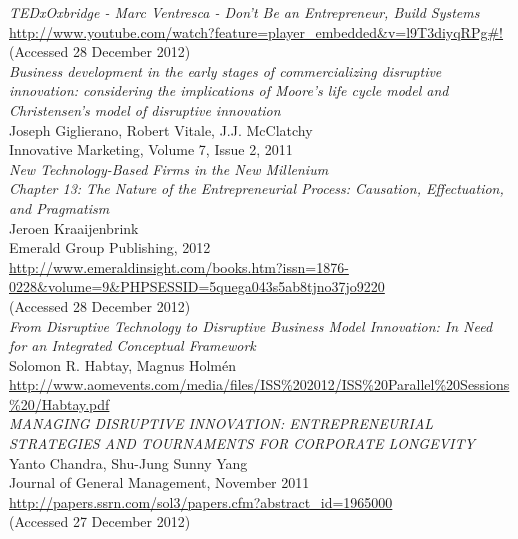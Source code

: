 \documentclass[a4paper,10pt]{book}
\begin{document}
\begin{thebibliography}{9}
 
  \emph{TEDxOxbridge - Marc Ventresca - Don't Be an Entrepreneur, Build Systems}\\
  \url{http://www.youtube.com/watch?feature=player_embedded&v=l9T3diyqRPg#!}\\
  (Accessed 28 December 2012)\\
 
  \emph{Business development in the early stages of commercializing
      disruptive innovation: considering the implications of Moore’s life
      cycle model and Christensen’s model of disruptive innovation}\\
  Joseph Giglierano, Robert Vitale, J.J. McClatchy\\
  Innovative Marketing, Volume 7, Issue 2, 2011\\
  

  \emph{New Technology-Based Firms in the New Millenium\\
	Chapter 13:  The Nature of the Entrepreneurial Process: Causation, Effectuation, and Pragmatism}\\
    Jeroen Kraaijenbrink\\
    Emerald Group Publishing, 2012\\
  \url{http://www.emeraldinsight.com/books.htm?issn=1876-0228&volume=9&PHPSESSID=5quega043s5ab8tjno37jo9220}\\
  (Accessed 28 December 2012)\\

  
  \emph{From Disruptive Technology to Disruptive Business Model Innovation: In Need for an Integrated Conceptual Framework}\\
  Solomon R. Habtay, Magnus Holmén\\
  \url{http://www.aomevents.com/media/files/ISS\%202012/ISS\%20Parallel\%20Sessions\%20/Habtay.pdf}\\
  
  \emph{MANAGING DISRUPTIVE INNOVATION: ENTREPRENEURIAL STRATEGIES AND TOURNAMENTS FOR CORPORATE LONGEVITY}\\
  Yanto Chandra, Shu-Jung Sunny Yang\\
   Journal of General Management, November 2011\\
  \url{http://papers.ssrn.com/sol3/papers.cfm?abstract_id=1965000}\\
  (Accessed 27 December 2012)\\


\end{thebibliography}
\end{document}
